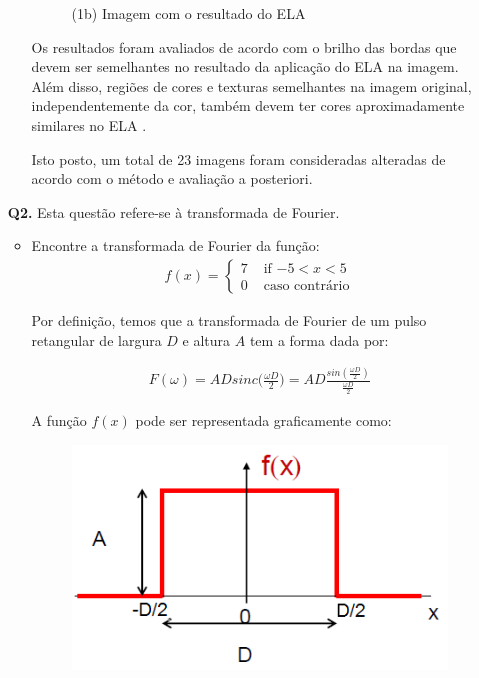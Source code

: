 \documentclass[12pt]{article}
\begin{document}
\begin{itemize}
\begin{itemize}
\begin{figure}[htb]
\begin{minipage}[b]{0.45\textwidth}
	\centerline{\label{fig1b} \small (1b) Imagem com o resultado do ELA}
\end{minipage}
\end{figure}

Os resultados foram avaliados de acordo com o brilho das bordas que devem ser semelhantes no resultado 
da aplicação do ELA na imagem. Além disso, regiões de cores e texturas semelhantes na imagem
original, independentemente da cor, também devem ter cores aproximadamente similares no ELA \cite{berkeleywebsite}.

Isto posto, um total de 23 imagens foram consideradas alteradas de acordo com o método e avaliação a posteriori.
\end{itemize}
%
%
%
\item[{\bf Q2.}] Esta questão refere-se à transformada de Fourier.
\begin{itemize}
\item Encontre a transformada de Fourier da função:
\begin{eqnarray*}
f(x) = \left\{ \begin{array}{rl} 
 7 &\mbox{ if $-5 < x < 5$} \\
 0 &\mbox{ caso contrário}
       \end{array} \right.
\end{eqnarray*}

Por definição, temos que a transformada de Fourier de um pulso
retangular de largura $D$ e altura $A$ tem a forma dada por:

\begin{eqnarray*}
    F(\omega) = ADsinc\bigg(\frac{\omega D}{2}\bigg)  = AD\frac{sin(\frac{\omega D}{2})}{\frac{\omega D}{2}}
\end{eqnarray*}

A função $f(x)$ pode ser representada graficamente como:
\begin{figure}[htb]
\centering   
\begin{minipage}[b]{0.45\textwidth}
	\centering
        \includegraphics[scale=0.45]{Q3Images/pulse_function.png} 
\end{minipage}
\end{figure}


\end{itemize}
\end{itemize}
\end{document}
